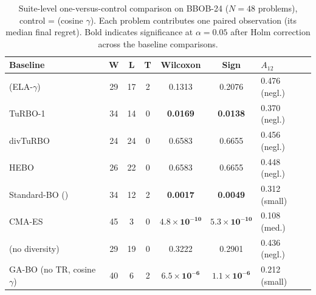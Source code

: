 \begin{table}[t]
\centering
\caption{Suite-level one-versus-control comparison on BBOB-24 ($N=48$ problems), control = \gab{} (cosine $\gamma$). Each problem contributes one paired observation (its median final regret). Bold indicates significance at $\alpha=0.05$ after Holm correction across the baseline comparisons.}
\label{tab:bbob_wilcoxon}
\footnotesize
\setlength{\tabcolsep}{3.5pt}
\begin{tabular}{lcccccl}
\toprule
Baseline & W & L & T & Wilcoxon & Sign & $A_{12}$ \\
\midrule
\gab{} (ELA-$\gamma$) & 29 & 17 & 2 & 0.1313 & 0.2076 & 0.476 (negl.) \\
TuRBO-1 & 34 & 14 & 0 & \textbf{0.0169} & \textbf{0.0138} & 0.370 (negl.) \\
divTuRBO & 24 & 24 & 0 & 0.6583 & 0.6655 & 0.456 (negl.) \\
HEBO & 26 & 22 & 0 & 0.6583 & 0.6655 & 0.448 (negl.) \\
Standard-BO (\qlogei{}) & 34 & 12 & 2 & \textbf{0.0017} & \textbf{0.0049} & 0.312 (small) \\
CMA-ES & 45 & 3 & 0 & $\mathbf{4.8\!\times\!10^{-10}}$ & $\mathbf{5.3\!\times\!10^{-10}}$ & 0.108 (med.) \\
\gab{} (no diversity) & 29 & 19 & 0 & 0.3222 & 0.2901 & 0.436 (negl.) \\
GA-BO (no TR, cosine $\gamma$) & 40 & 6 & 2 & $\mathbf{6.5\!\times\!10^{-6}}$ & $\mathbf{1.1\!\times\!10^{-6}}$ & 0.212 (small) \\
\bottomrule
\end{tabular}
\end{table}